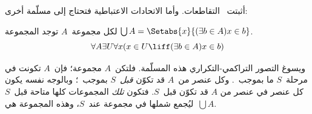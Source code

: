 \documentclass[../../../include/open-logic-section]{subfiles}
\begin{document}

أثبتت~ التقاطعات. وأما
الاتحادات الاعتباطية فتحتاج إلى مسلّمة أخرى:

\begin{axiom}[الاتحاد] لكل مجموعة~$A$ توجد المجموعة
$\bigcup A = \Setabs{x}{(\exists b \in A) x \in b}$.
\[
	\forall A \exists U \forall x(x \in U \liff (\exists b \in A)x \in b)
\]
\end{axiom}

ويسوغ التصور التراكمي-التكراري هذه المسلّمة. فلتكن~$A$ مجموعة؛ فإن~$A$
تكونت في مرحلة~$S$ ما بموجب~\stageshier. وكل عنصر من~$A$ قد تكوّن
\emph{قبل}~$S$ بموجب~\stagesacc؛ وبالوجه نفسه يكون كل عنصر في عنصر من
$A$ قد تكوّن قبل~$S$. فتكون \emph{تلك} المجموعات كلها متاحة قبل~$S$
ليُجمع شملها في مجموعة عند~$S$، وهذه المجموعة هي~$\bigcup A$.
\end{document}
